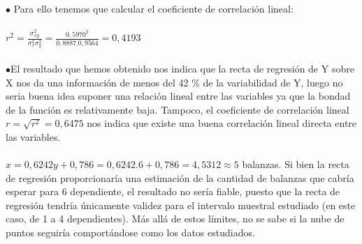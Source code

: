 	
	$\bullet$ Para ello tenemos que calcular el coeficiente de correlación lineal:\\ \\
	
	$r^{2} = \frac{\sigma_{xy}^{2}}{\sigma_{x}^{2}\sigma_{y}^{2}} = \frac{0,5970^{2}}{0,8887 . 0,9564} = 0,4193$\\ \\
 
		$\bullet$El resultado que hemos obtenido nos indica que la recta de regresión de Y sobre X nos da una información de menos
	del 42 \% de la variabilidad de Y, luego no seria buena idea suponer una relación lineal entre las variables ya que la bondad de la función es relativamente baja. 
	Tampoco, el coeficiente de correlación lineal $r =\sqrt{r^{2}} = 0,6475$ nos indica que existe una buena correlación lineal directa entre las variables. \\ \\
	
\subproblem	
	$x = 0,6242y +  0,786 = 0,6242 . 6 +  0,786 = 4,5312 \approx 5 $ balanzas. Si bien la recta de regresión proporcionaría una estimación de la cantidad de balanzas que cabría esperar para 6 dependiente, el resultado no sería fiable, puesto que la recta de regresión tendría únicamente validez para el intervalo muestral estudiado (en este caso, de 1 a 4 dependientes). Más allá de estos límites, no se sabe si la nube de puntos seguiría comportándose como los datos estudiados. 

